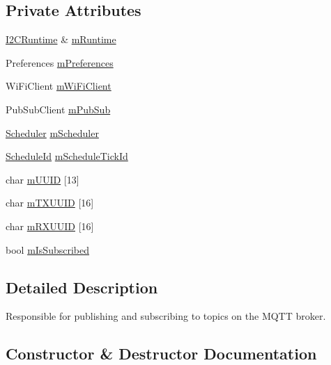 \subsection*{Private Attributes}
\begin{DoxyCompactItemize}
\item 
\mbox{\hyperlink{class_i2_c_runtime}{I2\+C\+Runtime}} \& \mbox{\hyperlink{class_m_q_t_t_manager_a3356cf93c237e44a28fbdc9e08e0b200}{m\+Runtime}}
\item 
Preferences \mbox{\hyperlink{class_m_q_t_t_manager_ab66bec340759e027dfa3ba3d37c1e6f7}{m\+Preferences}}
\item 
Wi\+Fi\+Client \mbox{\hyperlink{class_m_q_t_t_manager_af2d0eee7437193b3488b83e7afa56cd8}{m\+Wi\+Fi\+Client}}
\item 
Pub\+Sub\+Client \mbox{\hyperlink{class_m_q_t_t_manager_a7c702f0eda3bfa291a11591cebdaeed5}{m\+Pub\+Sub}}
\item 
\mbox{\hyperlink{class_scheduler}{Scheduler}} \mbox{\hyperlink{class_m_q_t_t_manager_aa6c36179bc117250fac8068de441775c}{m\+Scheduler}}
\item 
\mbox{\hyperlink{_scheduler_8h_a1e3b4605bdcbb8f6df7c47013e26e910}{Schedule\+Id}} \mbox{\hyperlink{class_m_q_t_t_manager_abce927e68d9a29836f6e24425a99e6fc}{m\+Schedule\+Tick\+Id}}
\item 
char \mbox{\hyperlink{class_m_q_t_t_manager_a5a9517149033c08d3915df0625da08ff}{m\+U\+U\+ID}} \mbox{[}13\mbox{]}
\item 
char \mbox{\hyperlink{class_m_q_t_t_manager_ad7c10e50256600dc9952501ac7a3eebb}{m\+T\+X\+U\+U\+ID}} \mbox{[}16\mbox{]}
\item 
char \mbox{\hyperlink{class_m_q_t_t_manager_ab03da55b905537f50873245b60944b8c}{m\+R\+X\+U\+U\+ID}} \mbox{[}16\mbox{]}
\item 
bool \mbox{\hyperlink{class_m_q_t_t_manager_a8c1e9df7f05ec6ca83421f4e2ad9fa33}{m\+Is\+Subscribed}}
\end{DoxyCompactItemize}


\subsection{Detailed Description}
Responsible for publishing and subscribing to topics on the M\+Q\+TT broker. 

\subsection{Constructor \& Destructor Documentation}
\mbox{\label{class_m_q_t_t_manager_af4a0454e2b8c10d989df9647c31611ad}} 
